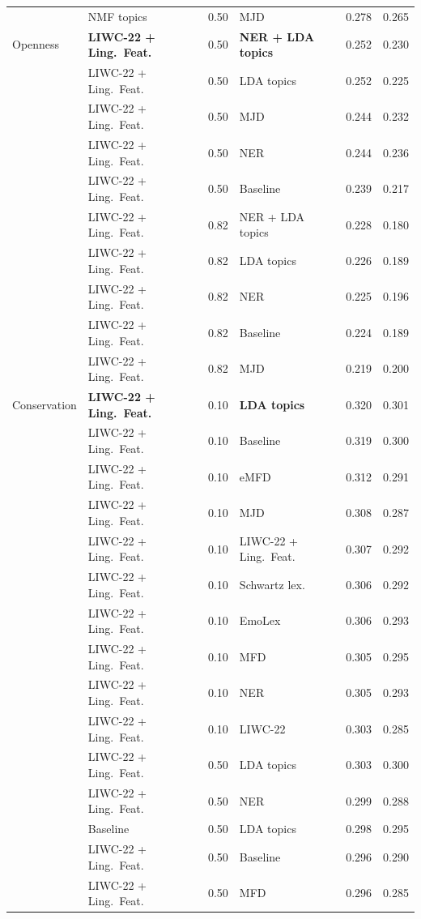 {\begin{longtable}{llclcc}
 & NMF topics & 0.50 & MJD & 0.278 & 0.265 \\
Openness & \textbf{LIWC-22 + Ling.\ Feat.} & 0.50 & \textbf{NER + LDA topics} & 0.252 & 0.230 \\
 & LIWC-22 + Ling.\ Feat. & 0.50 & LDA topics & 0.252 & 0.225 \\
 & LIWC-22 + Ling.\ Feat. & 0.50 & MJD & 0.244 & 0.232 \\
 & LIWC-22 + Ling.\ Feat. & 0.50 & NER & 0.244 & 0.236 \\
 & LIWC-22 + Ling.\ Feat. & 0.50 & Baseline & 0.239 & 0.217 \\
 & LIWC-22 + Ling.\ Feat. & 0.82 & NER + LDA topics & 0.228 & 0.180 \\
 & LIWC-22 + Ling.\ Feat. & 0.82 & LDA topics & 0.226 & 0.189 \\
 & LIWC-22 + Ling.\ Feat. & 0.82 & NER & 0.225 & 0.196 \\
 & LIWC-22 + Ling.\ Feat. & 0.82 & Baseline & 0.224 & 0.189 \\
 & LIWC-22 + Ling.\ Feat. & 0.82 & MJD & 0.219 & 0.200 \\
Conservation & \textbf{LIWC-22 + Ling.\ Feat.} & 0.10 & \textbf{LDA topics} & 0.320 & 0.301 \\
 & LIWC-22 + Ling.\ Feat. & 0.10 & Baseline & 0.319 & 0.300 \\
 & LIWC-22 + Ling.\ Feat. & 0.10 & eMFD & 0.312 & 0.291 \\
 & LIWC-22 + Ling.\ Feat. & 0.10 & MJD & 0.308 & 0.287 \\
 & LIWC-22 + Ling.\ Feat. & 0.10 & LIWC-22 + Ling.\ Feat. & 0.307 & 0.292 \\
 & LIWC-22 + Ling.\ Feat. & 0.10 & Schwartz lex. & 0.306 & 0.292 \\
 & LIWC-22 + Ling.\ Feat. & 0.10 & EmoLex & 0.306 & 0.293 \\
 & LIWC-22 + Ling.\ Feat. & 0.10 & MFD & 0.305 & 0.295 \\
 & LIWC-22 + Ling.\ Feat. & 0.10 & NER & 0.305 & 0.293 \\
 & LIWC-22 + Ling.\ Feat. & 0.10 & LIWC-22 & 0.303 & 0.285 \\
 & LIWC-22 + Ling.\ Feat. & 0.50 & LDA topics & 0.303 & 0.300 \\
 & LIWC-22 + Ling.\ Feat. & 0.50 & NER & 0.299 & 0.288 \\
 & Baseline & 0.50 & LDA topics & 0.298 & 0.295 \\
 & LIWC-22 + Ling.\ Feat. & 0.50 & Baseline & 0.296 & 0.290 \\
 & LIWC-22 + Ling.\ Feat. & 0.50 & MFD & 0.296 & 0.285 \\

\end{longtable}}
